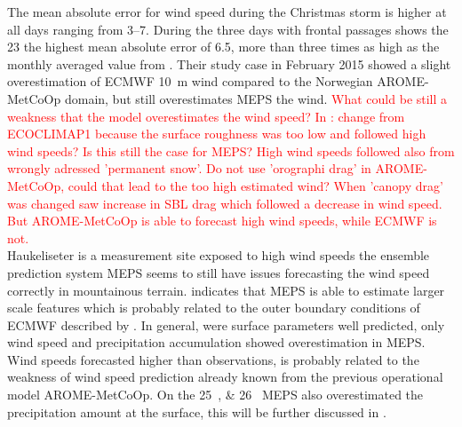 The mean absolute error for wind speed during the Christmas storm is higher at all days ranging from \SIrange{3}{7}{\mPs}.
During the three days with frontal passages shows the \SI{23}{\dec} the highest mean absolute error of \SI{6.5}{\mPs}, more than three times as high as the monthly averaged value from \citet{muller_arome-metcoop:_2017}. Their study case in February 2015 showed a slight overestimation of ECMWF \SI{10}{\metre} wind compared to the Norwegian AROME-MetCoOp domain, but still overestimates MEPS the wind.
\textcolor{red}{What could be still a weakness that the model overestimates the wind speed? In \citet{muller_arome-metcoop:_2017}: change from ECOCLIMAP1 because the surface roughness was too low and followed high wind speeds? Is this still the case for MEPS? High wind speeds followed also from wrongly adressed 'permanent snow'. Do not use 'orographi drag' in AROME-MetCoOp, could that lead to the too high estimated wind? When 'canopy drag' was changed saw increase in SBL drag which followed a decrease in wind speed. But AROME-MetCoOp is able to forecast high wind speeds, while ECMWF is not.}
\\
Haukeliseter is a measurement site exposed to high wind speeds \citep{wolff_measurements_2013,wolff_derivation_2015} the ensemble prediction system MEPS seems to still have issues forecasting the wind speed correctly in mountainous terrain.
 indicates that MEPS is able to estimate larger scale features which is probably related to the outer boundary conditions of ECMWF described by \citet{dahlgren_comparison_2013}.
In general, were surface parameters well predicted, only wind speed and precipitation accumulation showed overestimation in MEPS. Wind speeds forecasted higher than observations, is probably related to the weakness of wind speed prediction already known from the previous operational model AROME-MetCoOp. On the \SIlist{25;26}{\dec} MEPS also overestimated the precipitation amount at the surface, this will be further discussed in .

